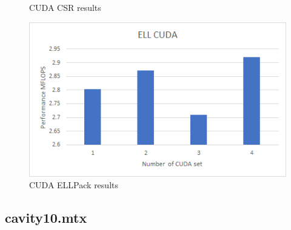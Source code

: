 \documentclass{scrreprt}
\begin{document}
\begin{figure}[ht]
\begin{minipage}[b]{0.5\linewidth}
    \caption{CUDA CSR results} 
    \vspace{4ex}
  \end{minipage}%
  \begin{minipage}[b]{0.5\linewidth}
    \centering
    \includegraphics[width=.9\linewidth]{rdist2ELLCUDA.png} 
    \caption{CUDA ELLPack  results} 
    \vspace{4ex}
  \end{minipage} 
\end{figure}
\FloatBarrier




\subsection{cavity10.mtx}
\end{document}
